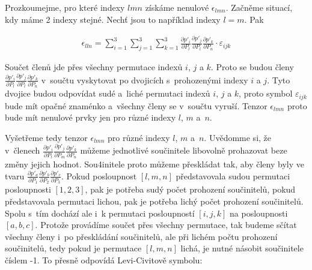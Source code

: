 Prozkoumejme, pro které indexy \(lmn\) získáme nenulové \(\epsilon_{lmn}\). Začněme situací, kdy máme 2 indexy stejné. Nechť jsou to například indexy \(l = m\). Pak

\begin{equation}
\begin{split}
\epsilon_{lln} = \sum_{i=1}^3 \sum_{j=1}^3 \sum_{k=1}^3 \frac{\partial p'_i}{\partial P_l} \frac{\partial p'_j}{\partial P_l} \frac{\partial p'_k}{\partial P_n} \cdot \varepsilon_{ijk}
\end{split}
\end{equation}

Součet členů jde přes všechny permutace indexů \(i\), \(j\) a \(k\). Proto se budou členy \(\frac{\partial p'_i}{\partial P_l} \frac{\partial p'_j}{\partial P_l} \frac{\partial p'_k}{\partial P_n}\) v~součtu vyskytovat po dvojicích s~prohozenými indexy \(i\) a \(j\). Tyto dvojice budou odpovídat sudé a~liché permutaci indexů \(i\), \(j\) a \(k\), proto symbol \(\varepsilon_{ijk}\) bude mít opačné znaménko a~všechny členy se v~součtu vyruší. Tenzor \(\epsilon_{lmn}\) proto bude mít nenulové prvky jen pro různé indexy \(l\), \(m\) a~\(n\).

Vyšetřeme tedy tenzor \(\epsilon_{lmn}\) pro různé indexy \(l\), \(m\) a~\(n\). Uvědomme si, že v~členech \(\frac{\partial p'_i}{\partial P_l} \frac{\partial p'_j}{\partial P_m} \frac{\partial p'_k}{\partial P_n}\) můžeme jednotlivé součinitele libovolně prohazovat beze změny jejich hodnot. Sou4initele proto můžeme přeskládat tak, aby členy byly ve tvaru \(\frac{\partial p'_a}{\partial P_1} \frac{\partial p'_b}{\partial P_2} \frac{\partial p'_c}{\partial P_3}\). Pokud posloupnost \([l, m, n]\) představovala sudou permutaci posloupnosti \([1, 2, 3]\), pak je potřeba sudý počet prohození součinitelů, pokud představovala permutaci lichou, pak je potřeba lichý počet prohození součinitelů. Spolu s~tím dochází ale i~k permutaci posloupností \([i, j, k]\) na posloupnosti \([a, b, c]\). Protože provádíme součet přes všechny permutace, tak budeme sčítat všechny členy i~po přeskládání součinitelů, ale při lichém počtu prohození součinitelů, tedy pokud je permutace \([l, m, n]\) lichá, je nutné násobit součinitele číslem -1. To přesně odpovídá Levi-Civitově symbolu:

